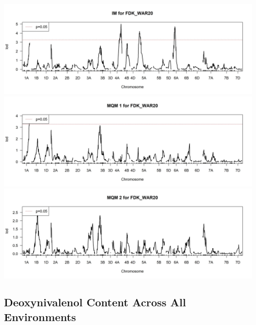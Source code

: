 \documentclass[
]{article}
\begin{document}
\includegraphics{Scan_IM_FDK_WAR20.jpg}
\includegraphics{Scan_MQM1_FDK_WAR20.jpg}
\includegraphics{Scan_MQM2_FDK_WAR20.jpg} \pagebreak

\subsection{Deoxynivalenol Content Across All
Environments}\label{deoxynivalenol-content-across-all-environments}
\end{document}
